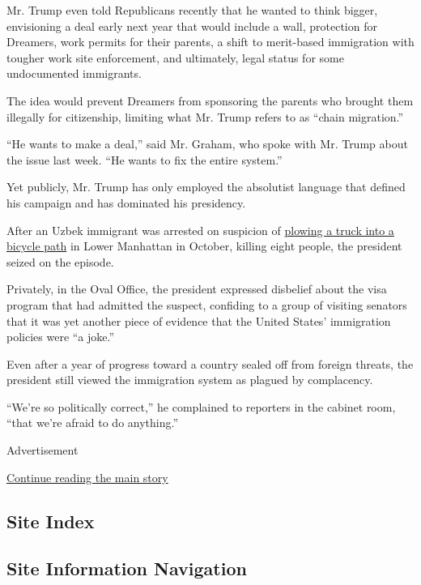 Mr. Trump even told Republicans recently that he wanted to think bigger,
envisioning a deal early next year that would include a wall, protection
for Dreamers, work permits for their parents, a shift to merit-based
immigration with tougher work site enforcement, and ultimately, legal
status for some undocumented immigrants.

The idea would prevent Dreamers from sponsoring the parents who brought
them illegally for citizenship, limiting what Mr. Trump refers to as
``chain migration.''

``He wants to make a deal,'' said Mr. Graham, who spoke with Mr. Trump
about the issue last week. ``He wants to fix the entire system.''

Yet publicly, Mr. Trump has only employed the absolutist language that
defined his campaign and has dominated his presidency.

After an Uzbek immigrant was arrested on suspicion of
\href{https://www.nytimes3xbfgragh.onion/2017/10/31/nyregion/police-shooting-lower-manhattan.html}{plowing
a truck into a bicycle path} in Lower Manhattan in October, killing
eight people, the president seized on the episode.

Privately, in the Oval Office, the president expressed disbelief about
the visa program that had admitted the suspect, confiding to a group of
visiting senators that it was yet another piece of evidence that the
United States' immigration policies were ``a joke.''

Even after a year of progress toward a country sealed off from foreign
threats, the president still viewed the immigration system as plagued by
complacency.

``We're so politically correct,'' he complained to reporters in the
cabinet room, ``that we're afraid to do anything.''

Advertisement

\protect\hyperlink{after-bottom}{Continue reading the main story}

\hypertarget{site-index}{%
\subsection{Site Index}\label{site-index}}

\hypertarget{site-information-navigation}{%
\subsection{Site Information
Navigation}\label{site-information-navigation}}

